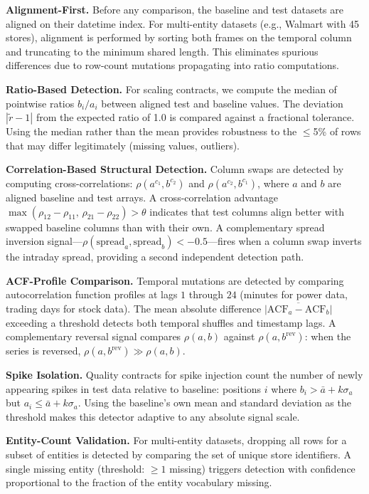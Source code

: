 \documentclass[journal]{IEEEtran}
\begin{document}
\textbf{Alignment-First.}  Before any comparison, the baseline and test
datasets are aligned on their datetime index.  For multi-entity datasets
(e.g., Walmart with 45 stores), alignment is performed by sorting both
frames on the temporal column and truncating to the minimum shared length.
This eliminates spurious differences due to row-count mutations propagating
into ratio computations.

\textbf{Ratio-Based Detection.}  For scaling contracts, we compute the
median of pointwise ratios $b_i / a_i$ between aligned test and baseline
values.  The deviation $|\tilde{r} - 1|$ from the expected ratio of 1.0
is compared against a fractional tolerance.  Using the median rather than
the mean provides robustness to the $\leq$5\% of rows that may differ
legitimately (missing values, outliers).

\textbf{Correlation-Based Structural Detection.}  Column swaps are detected
by computing cross-correlations: $\rho(a^{c_1}, b^{c_2})$ and
$\rho(a^{c_2}, b^{c_1})$, where $a$ and $b$ are aligned baseline and test
arrays.  A cross-correlation advantage $\max(\rho_{12} - \rho_{11},\,
\rho_{21} - \rho_{22}) > \theta$ indicates that test columns align better
with swapped baseline columns than with their own.  A complementary spread
inversion signal---$\rho(\text{spread}_a, \text{spread}_b) < -0.5$---fires
when a column swap inverts the intraday spread, providing a second
independent detection path.

\textbf{ACF-Profile Comparison.}  Temporal mutations are detected by
comparing autocorrelation function profiles at lags $1$ through $24$
(minutes for power data, trading days for stock data).  The mean absolute
difference $\overline{|\mathrm{ACF}_a - \mathrm{ACF}_b|}$ exceeding a
threshold detects both temporal shuffles and timestamp lags.  A
complementary reversal signal compares $\rho(a, b)$ against
$\rho(a, b^{\mathrm{rev}})$: when the series is reversed,
$\rho(a, b^{\mathrm{rev}}) \gg \rho(a, b)$.

\textbf{Spike Isolation.}  Quality contracts for spike injection count the
number of newly appearing spikes in test data relative to baseline:
positions $i$ where $b_i > \bar{a} + k\sigma_a$ but
$a_i \leq \bar{a} + k\sigma_a$.  Using the baseline's own mean and standard
deviation as the threshold makes this detector adaptive to any absolute
signal scale.

\textbf{Entity-Count Validation.}  For multi-entity datasets, dropping all
rows for a subset of entities is detected by comparing the set of unique
store identifiers.  A single missing entity (threshold: $\geq 1$ missing)
triggers detection with confidence proportional to the fraction of the
entity vocabulary missing.
\end{document}
